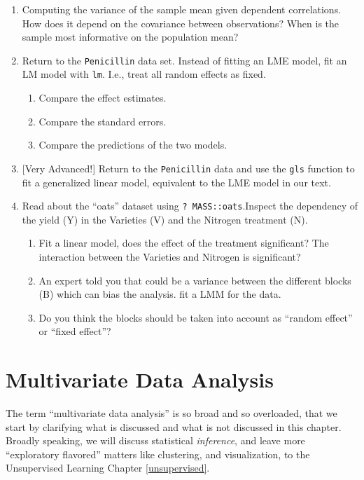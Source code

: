 \documentclass[]{book}
\providecommand{\tightlist}{%
  \setlength{\itemsep}{0pt}\setlength{\parskip}{0pt}}
\theoremstyle{definition}
\theoremstyle{definition}
\theoremstyle{definition}
\theoremstyle{remark}
\begin{document}
\begin{enumerate}
\def\labelenumi{\arabic{enumi}.}
\item
  Computing the variance of the sample mean given dependent
  correlations. How does it depend on the covariance between
  observations? When is the sample most informative on the population
  mean?
\item
  Return to the \texttt{Penicillin} data set. Instead of fitting an LME
  model, fit an LM model with \texttt{lm}. I.e., treat all random
  effects as fixed.

  \begin{enumerate}
  \def\labelenumii{\alph{enumii}.}
  \tightlist
  \item
    Compare the effect estimates.
  \item
    Compare the standard errors.
  \item
    Compare the predictions of the two models.
  \end{enumerate}
\item
  {[}Very Advanced!{]} Return to the \texttt{Penicillin} data and use
  the \texttt{gls} function to fit a generalized linear model,
  equivalent to the LME model in our text.
\item
  Read about the ``oats'' dataset using \texttt{?\ MASS::oats}.Inspect
  the dependency of the yield (Y) in the Varieties (V) and the Nitrogen
  treatment (N).

  \begin{enumerate}
  \def\labelenumii{\arabic{enumii}.}
  \tightlist
  \item
    Fit a linear model, does the effect of the treatment significant?
    The interaction between the Varieties and Nitrogen is significant?
  \item
    An expert told you that could be a variance between the different
    blocks (B) which can bias the analysis. fit a LMM for the data.
  \item
    Do you think the blocks should be taken into account as ``random
    effect'' or ``fixed effect''?
  \end{enumerate}
\end{enumerate}

\chapter{Multivariate Data Analysis}\label{multivariate}

The term ``multivariate data analysis'' is so broad and so overloaded,
that we start by clarifying what is discussed and what is not discussed
in this chapter. Broadly speaking, we will discuss statistical
\emph{inference}, and leave more ``exploratory flavored'' matters like
clustering, and visualization, to the Unsupervised Learning Chapter
\ref{unsupervised}.
\end{document}

